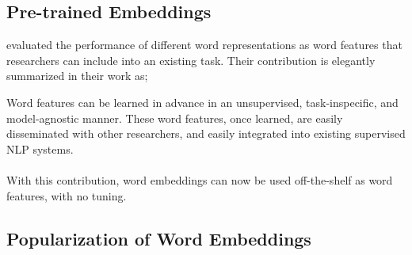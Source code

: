 
\subsection{Pre-trained Embeddings}%
\label{sub:pre_trained_embeddings}

\textcite{p._turian_word_2010} evaluated the performance of different word representations as word features that researchers can include into an existing task.
Their contribution is elegantly summarized in their work as;
\begin{displayquote}
    Word features can be learned in advance in an unsupervised, task-inspecific, and model-agnostic manner.
    These word features, once learned, are easily disseminated with other researchers, and easily integrated into existing supervised NLP systems. \\
    \textelp{} \\
    With this contribution, word embeddings can now be used off-the-shelf as word features, with no tuning.
\end{displayquote}



\subsection{Popularization of Word Embeddings}%
\label{sub:popularization_of_word_embeddings}

